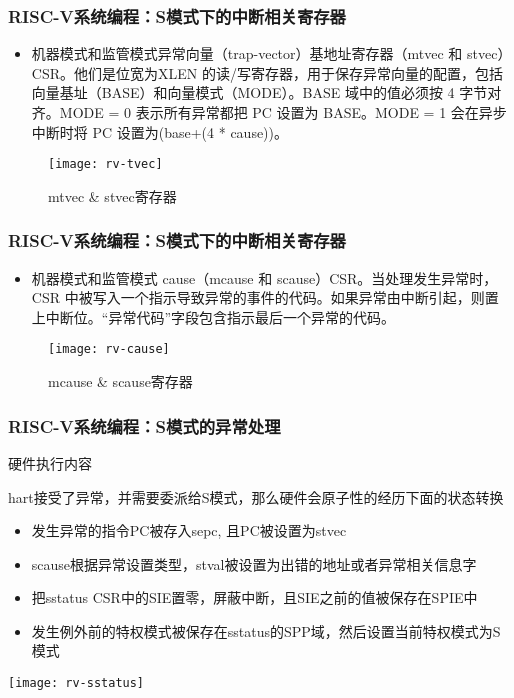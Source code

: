 
\begin{frame}
    \frametitle{RISC-V系统编程：S模式下的中断相关寄存器}
    \begin{itemize}
        \item 机器模式和监管模式异常向量（trap-vector）基地址寄存器（mtvec 和 stvec）CSR。他们是位宽为XLEN 的读/写寄存器，用于保存异常向量的配置，包括向量基址（BASE）和向量模式（MODE）。BASE 域中的值必须按 4 字节对齐。MODE = 0 表示所有异常都把 PC 设置为 BASE。MODE = 1 会在异步中断时将 PC 设置为(base+(4 * cause))。
    \end{itemize}   
    \begin{figure}
        \centering
        \texttt{[image: rv-tvec]}
        \caption{mtvec  \& stvec寄存器}
    \end{figure}
\end{frame}


\begin{frame}
    \frametitle{RISC-V系统编程：S模式下的中断相关寄存器}
    \begin{itemize}
        \item 机器模式和监管模式 cause（mcause 和 scause）CSR。当处理发生异常时，CSR 中被写入一个指示导致异常的事件的代码。如果异常由中断引起，则置上中断位。“异常代码”字段包含指示最后一个异常的代码。
    \end{itemize}   
    \begin{figure}
        \centering
        \texttt{[image: rv-cause]}
        \caption{mcause  \& scause寄存器}
    \end{figure}
\end{frame}

\begin{frame}
    \frametitle{RISC-V系统编程：S模式的异常处理}
     硬件执行内容
     
     hart接受了异常，并需要委派给S模式，那么硬件会原子性的经历下面的状态转换
    \begin{itemize}
        \item 发生异常的指令PC被存入sepc, 且PC被设置为stvec
        \item scause根据异常设置类型，stval被设置为出错的地址或者异常相关信息字
        \item 把sstatus CSR中的SIE置零，屏蔽中断，且SIE之前的值被保存在SPIE中
        \item 发生例外前的特权模式被保存在sstatus的SPP域，然后设置当前特权模式为S模式
        
    \end{itemize}
        \centering
    \texttt{[image: rv-sstatus]}
\end{frame}

